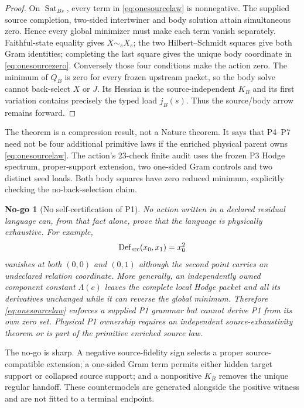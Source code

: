 \documentclass[11pt,a4paper]{article}
\newtheorem{nogo}[definition]{No-go}
\theoremstyle{remark}
\newcommand{\Defsrc}{\operatorname{Def}_{\rm src}}
\newcommand{\Sat}{\operatorname{Sat}_{Bs}}
\begin{document}
\begin{proof}
On $\Sat$, every term in \eqref{eq:onesourcelaw} is nonnegative.  The supplied
source completion, two-sided intertwiner and body solution attain simultaneous
zero.  Hence every global minimizer must make each term vanish separately.
Faithful-state equality gives $X\sim_sX_s$; the two Hilbert--Schmidt squares
give both Gram identities; completing the last square gives the unique body
coordinate in \eqref{eq:onesourcezero}.  Conversely those four conditions
make the action zero.  The minimum of $Q_B$ is zero for every frozen upstream
packet, so the body solve cannot back-select $X$ or $J$.  Its Hessian is the
source-independent $K_B$ and its first variation contains precisely the typed
load $j_B(s)$.  Thus the source/body arrow remains forward.
\end{proof}

The theorem is a compression result, not a Nature theorem.  It says that
P4--P7 need not be four additional primitive laws if the enriched physical
parent owns \eqref{eq:onesourcelaw}.  The action's 23-check finite audit uses
the frozen P3 Hodge spectrum, proper-support extension, two one-sided Gram
controls and two distinct seed loads.  Both body squares have zero reduced
minimum, explicitly checking the no-back-selection claim.

\begin{nogo}[No self-certification of P1]
No action written in a declared residual language can, from that fact alone,
prove that the language is physically exhaustive.  For example,
\begin{equation}
 \Defsrc(x_0,x_1)=x_0^2
 \label{eq:incompletelanguage}
\end{equation}
vanishes at both $(0,0)$ and $(0,1)$ although the second point carries an
undeclared relation coordinate.  More generally, an independently owned
component constant $\Lambda(c)$ leaves the complete local Hodge packet and all
its derivatives unchanged while it can reverse the global minimum.
Therefore \eqref{eq:onesourcelaw} enforces a supplied P1 grammar but cannot
derive P1 from its own zero set.  Physical P1 ownership requires an independent
source-exhaustivity theorem or is part of the primitive enriched source law.
\end{nogo}

The no-go is sharp.  A negative source-fidelity sign selects a proper
source-compatible extension; a one-sided Gram term permits either hidden
target support or collapsed source support; and a nonpositive $K_B$ removes
the unique regular handoff.  These countermodels are generated alongside the
positive witness and are not fitted to a terminal endpoint.
\end{document}
